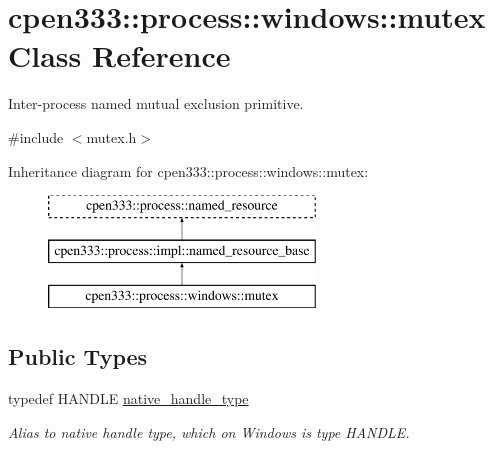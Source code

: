 \hypertarget{classcpen333_1_1process_1_1windows_1_1mutex}{}\section{cpen333\+:\+:process\+:\+:windows\+:\+:mutex Class Reference}
\label{classcpen333_1_1process_1_1windows_1_1mutex}


Inter-\/process named mutual exclusion primitive.  




{\ttfamily \#include $<$mutex.\+h$>$}

Inheritance diagram for cpen333\+:\+:process\+:\+:windows\+:\+:mutex\+:\begin{figure}[H]
\begin{center}
\leavevmode
\includegraphics[height=3.000000cm]{classcpen333_1_1process_1_1windows_1_1mutex}
\end{center}
\end{figure}
\subsection*{Public Types}
\begin{DoxyCompactItemize}
\item 
\mbox{\label{classcpen333_1_1process_1_1windows_1_1mutex_ae2343808c470604a4291106bfad2ca50}} 
typedef H\+A\+N\+D\+LE \hyperlink{classcpen333_1_1process_1_1windows_1_1mutex_ae2343808c470604a4291106bfad2ca50}{native\+\_\+handle\+\_\+type}
\begin{DoxyCompactList}\small\item\em Alias to native handle type, which on Windows is type H\+A\+N\+D\+LE. \end{DoxyCompactList}\end{DoxyCompactItemize}
